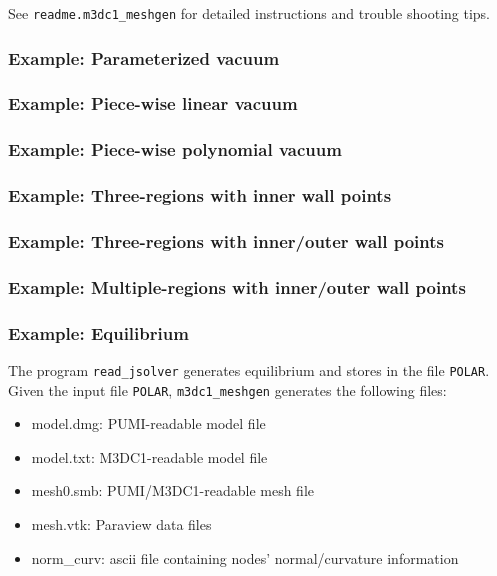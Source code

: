 See \texttt{readme.m3dc1\_meshgen} for detailed instructions and trouble shooting tips.

\subsubsection{Example: Parameterized vacuum}

\subsubsection{Example: Piece-wise linear vacuum}

\subsubsection{Example: Piece-wise polynomial vacuum} 

\subsubsection{Example: Three-regions with inner wall points}

\subsubsection{Example: Three-regions with inner/outer wall points}

\subsubsection{Example: Multiple-regions with inner/outer wall points}

\subsubsection{Example: Equilibrium}

The program \texttt{read\_jsolver} generates equilibrium and stores in the file \texttt{POLAR}. Given the input file \texttt{POLAR}, \texttt{m3dc1\_meshgen} generates the following files:
\begin{itemize}
\item	model.dmg: PUMI-readable model file
\item	model.txt: M3DC1-readable model file
\item	mesh0.smb: PUMI/M3DC1-readable mesh file
\item	mesh.vtk: Paraview data files
\item	norm\_curv: ascii file containing nodes' normal/curvature information
\end{itemize}

